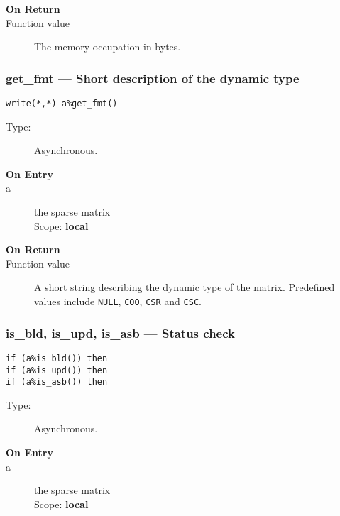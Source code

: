 \begin{description}
\item[\bf On Return]
\item[Function value] The memory occupation in bytes.
\end{description}


\subsubsection*{get\_fmt  --- Short description of the dynamic type}

\begin{verbatim}
write(*,*) a%get_fmt()
\end{verbatim}

\begin{description}
\item[Type:] Asynchronous.
\item[\bf On Entry]
\item[a] the sparse matrix\\
Scope: {\bf local}\\
\end{description}

\begin{description}
\item[\bf On Return]
\item[Function value] A short string describing the dynamic type of
  the matrix. Predefined values include \verb|NULL|, \verb|COO|,
  \verb|CSR| and \verb|CSC|. 
\end{description}

\subsubsection*{is\_bld, is\_upd, is\_asb  --- Status check}

\begin{verbatim}
if (a%is_bld()) then 
if (a%is_upd()) then 
if (a%is_asb()) then 
\end{verbatim}

\begin{description}
\item[Type:] Asynchronous.
\item[\bf On Entry]
\item[a] the sparse matrix\\
Scope: {\bf local}\\
\end{description}

